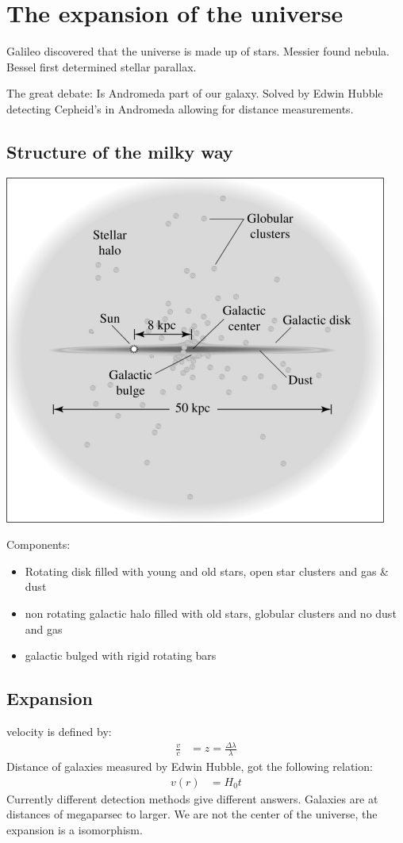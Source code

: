 \documentclass[11pt,a4paper]{article}
\begin{document}
\section{The expansion of the universe}
Galileo discovered that the universe is made up of stars.
Messier found nebula. 
Bessel first determined stellar parallax. 

The great debate: 
Is Andromeda part of our galaxy.
Solved by Edwin Hubble detecting Cepheid's in Andromeda allowing for distance measurements.
\subsection{Structure of the milky way}
\begin{center}
    \includegraphics[width=0.5\linewidth]{screenshot_2024-01-23-105305.png}
\end{center}
Components: 
\begin{itemize}
    \item Rotating disk filled with young and old stars, open star clusters and gas \& dust 
    \item non rotating galactic halo filled with old stars, globular clusters and no dust and gas 
    \item galactic bulged with rigid rotating bars
\end{itemize}
\subsection{Expansion} \label{sec:Expansion}
velocity is defined by: 
\begin{align*}
    \frac v c &= z = \frac {\Delta \lambda} {\lambda} 
\end{align*}
Distance of galaxies measured by Edwin Hubble, got the following relation:
\begin{align*}
    v(r) &= H_0 t 
\end{align*}
Currently different detection methods give different answers. 
Galaxies are at distances of megaparsec to larger.
We are not the center of the universe, the expansion is a isomorphism.
\end{document}
